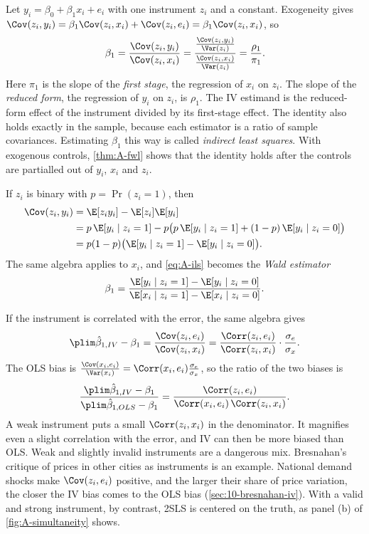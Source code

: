 Let $y_i = \beta_0 + \beta_1x_i + e_i$ with one instrument $z_i$ and a constant. Exogeneity gives
$\Cov(z_i, y_i) = \beta_1\Cov(z_i, x_i) + \Cov(z_i, e_i) = \beta_1\Cov(z_i, x_i)$, so
\begin{equation}\label{eq:A-ils}
\beta_1 = \frac{\Cov(z_i, y_i)}{\Cov(z_i, x_i)}
= \frac{\frac{\Cov(z_i, y_i)}{\Var(z_i)}}{\frac{\Cov(z_i, x_i)}{\Var(z_i)}} = \frac{\rho_1}{\pi_1} .
\end{equation}
Here $\pi_1$ is the slope of the \emph{first stage}, the regression of $x_i$ on $z_i$. The slope of the
\emph{reduced form}, the regression of $y_i$ on $z_i$, is $\rho_1$. The IV estimand is the reduced-form effect of the
instrument divided by its first-stage effect. The identity also holds exactly in the sample, because each
estimator is a ratio of sample covariances. Estimating $\beta_1$ this way is called \emph{indirect least
squares}. With exogenous controls, \cref{thm:A-fwl} shows that the identity holds after the controls are
partialled out of $y_i$, $x_i$ and $z_i$.

If $z_i$ is binary with $p = \Pr(z_i = 1)$, then
\begin{align*}
\Cov(z_i, y_i) &= \E[z_iy_i] - \E[z_i]\E[y_i] \\
&= p\,\E[y_i \mid z_i = 1] - p\bigl(p\,\E[y_i \mid z_i = 1] + (1 - p)\,\E[y_i \mid z_i = 0]\bigr) \\
&= p(1 - p)\bigl(\E[y_i \mid z_i = 1] - \E[y_i \mid z_i = 0]\bigr) .
\end{align*}
The same algebra applies to $x_i$, and \eqref{eq:A-ils} becomes the \emph{Wald estimator}
\begin{equation}\label{eq:A-wald-estimator}
\beta_1 = \frac{\E[y_i \mid z_i = 1] - \E[y_i \mid z_i = 0]}{\E[x_i \mid z_i = 1] - \E[x_i \mid z_i = 0]} .
\end{equation}

If the instrument is correlated with the error, the same algebra gives
\begin{equation}\label{eq:A-iv-bias}
\plim\hat\beta_{1,IV} - \beta_1 = \frac{\Cov(z_i, e_i)}{\Cov(z_i, x_i)}
= \frac{\Corr(z_i, e_i)}{\Corr(z_i, x_i)}\cdot\frac{\sigma_e}{\sigma_x} .
\end{equation}
The OLS bias is $\frac{\Cov(x_i, e_i)}{\Var(x_i)} = \Corr(x_i, e_i)\frac{\sigma_e}{\sigma_x}$, so the ratio of the
two biases is
\begin{equation*}
\frac{\plim\hat\beta_{1,IV} - \beta_1}{\plim\hat\beta_{1,OLS} - \beta_1}
= \frac{\Corr(z_i, e_i)}{\Corr(x_i, e_i)\,\Corr(z_i, x_i)} .
\end{equation*}
A weak instrument puts a small $\Corr(z_i, x_i)$ in the denominator. It magnifies even a slight correlation
with the error, and IV can then be more biased than OLS. Weak and slightly invalid instruments are a
dangerous mix. Bresnahan's critique of prices in other cities as instruments is an example. National demand
shocks make $\Cov(z_i, e_i)$ positive, and the larger their share of price variation, the closer the IV bias
comes to the OLS bias (\cref{sec:10-bresnahan-iv}). With a valid and strong instrument, by contrast, 2SLS is
centered on the truth, as panel (b) of \cref{fig:A-simultaneity} shows.

